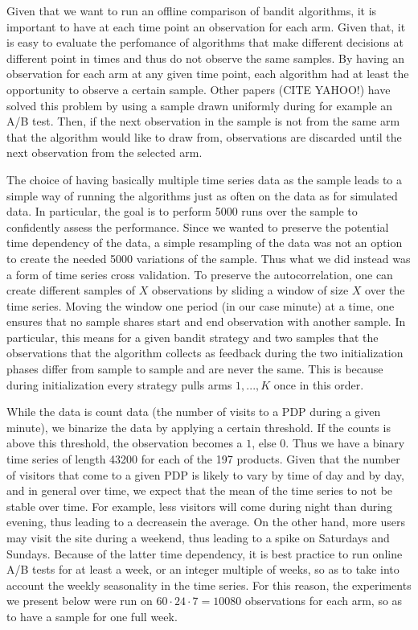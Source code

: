 \documentclass[12pt,]{article}
\begin{document}
Given that we want to run an offline comparison of bandit algorithms, it
is important to have at each time point an observation for each arm.
Given that, it is easy to evaluate the perfomance of algorithms that
make different decisions at different point in times and thus do not
observe the same samples. By having an observation for each arm at any
given time point, each algorithm had at least the opportunity to observe
a certain sample. Other papers (CITE YAHOO!) have solved this problem by
using a sample drawn uniformly during for example an A/B test. Then, if
the next observation in the sample is not from the same arm that the
algorithm would like to draw from, observations are discarded until the
next observation from the selected arm.

The choice of having basically multiple time series data as the sample
leads to a simple way of running the algorithms just as often on the
data as for simulated data. In particular, the goal is to perform 5000
runs over the sample to confidently assess the performance. Since we
wanted to preserve the potential time dependency of the data, a simple
resampling of the data was not an option to create the needed 5000
variations of the sample. Thus what we did instead was a form of time
series cross validation. To preserve the autocorrelation, one can create
different samples of \(X\) observations by sliding a window of size
\(X\) over the time series. Moving the window one period (in our case
minute) at a time, one ensures that no sample shares start and end
observation with another sample. In particular, this means for a given
bandit strategy and two samples that the observations that the algorithm
collects as feedback during the two initialization phases differ from
sample to sample and are never the same. This is because during
initialization every strategy pulls arms \(1, ..., K\) once in this
order.

While the data is count data (the number of visits to a PDP during a
given minute), we binarize the data by applying a certain threshold. If
the counts is above this threshold, the observation becomes a \(1\),
else \(0\). Thus we have a binary time series of length 43200 for each
of the 197 products. Given that the number of visitors that come to a
given PDP is likely to vary by time of day and by day, and in general
over time, we expect that the mean of the time series to not be stable
over time. For example, less visitors will come during night than during
evening, thus leading to a decreasein the average. On the other hand,
more users may visit the site during a weekend, thus leading to a spike
on Saturdays and Sundays. Because of the latter time dependency, it is
best practice to run online A/B tests for at least a week, or an integer
multiple of weeks, so as to take into account the weekly seasonality in
the time series. For this reason, the experiments we present below were
run on \(60 \cdot 24 \cdot 7 = 10080\) observations for each arm, so as
to have a sample for one full week.
\end{document}
